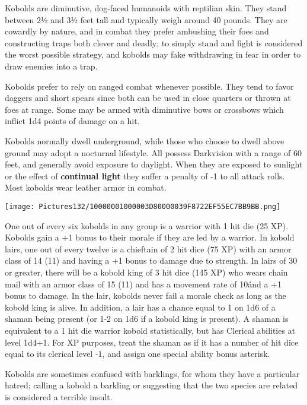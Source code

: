 \documentclass[a4paper,twoside,openany,10pt]{book}
\begin{document}
\begin{multicols}{2}
Kobolds are diminutive, dog-faced humanoids with reptilian skin. They stand between 2½ and 3½ feet tall and typically weigh around 40 pounds. They are cowardly by nature, and in combat they prefer ambushing their foes and constructing traps both clever and deadly; to simply stand and fight is considered the worst possible strategy, and kobolds may fake withdrawing in fear in order to draw enemies into a trap.

Kobolds prefer to rely on ranged combat whenever possible. They tend to favor daggers and short spears since both can be used in close quarters or thrown at foes at range. Some may be armed with diminutive bows or crossbows which inflict 1d4 points of damage on a hit. 

Kobolds normally dwell underground, while those who choose to dwell above ground may adopt a nocturnal lifestyle. All possess Darkvision with a range of 60 feet, and generally avoid exposure to daylight. When they are exposed to sunlight or the effect of \textbf{continual light }they suffer a penalty of -1 to all attack rolls. Most kobolds wear leather armor in combat.\\


\begin{center}
	 \texttt{[image: Pictures132/10000001000003D80000039F8722EF55EC7BB9BB.png]}
\end{center} \medskip

One out of every six kobolds in any group is a warrior with 1 hit die (25 XP). Kobolds gain a +1 bonus to their morale if they are led by a warrior. In kobold lairs, one out of every twelve is a chieftain of 2 hit dice (75 XP) with an armor class of 14 (11) and having a +1 bonus to damage due to strength. In lairs of 30 or greater, there will be a kobold king of 3 hit dice (145 XP) who wears chain mail with an armor class of 15 (11) and has a movement rate of 10\' and a +1 bonus to damage. In the lair, kobolds never fail a morale check as long as the kobold king is alive. In addition, a lair has a chance equal to 1 on 1d6 of a shaman being present (or 1-2 on 1d6 if a kobold king is present). A shaman is equivalent to a 1 hit die warrior kobold statistically, but has Clerical abilities at level 1d4+1. For XP purposes, treat the shaman as if it has a number of hit dice equal to its clerical level -1, and assign one special ability bonus asterisk.

Kobolds are sometimes confused with barklings, for whom they have a particular hatred; calling a kobold a barkling or suggesting that the two species are related is considered a terrible insult.



\end{multicols}
\end{document}

